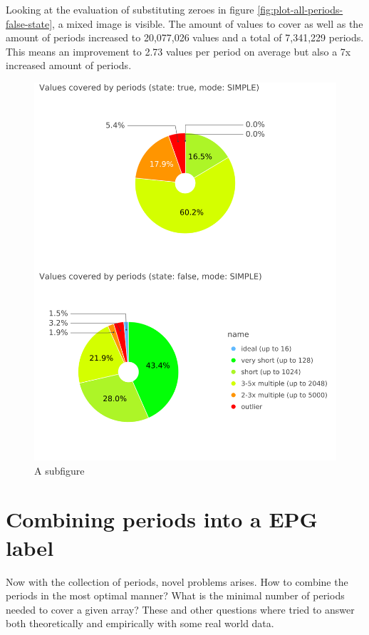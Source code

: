 Looking at the evaluation of substituting zeroes in figure \ref{fig:plot-all-periods-false-state}, a mixed image is visible. The amount of values to cover as well as the amount of periods increased to 20,077,026 values and a total of 7,341,229 periods. This means an improvement to 2.73 values per period on average but also a 7x increased amount of periods.

\begin{figure}[h]
	\includegraphics[width=\linewidth]{charts/all-covered-values-pie-chart-combined-ontop.png}
	\caption{A subfigure}
	\label{fig:sub2}
\end{figure}



\newpage

\section{Combining periods into a EPG label}

Now with the collection of periods, novel problems arises. How to combine the periods in the most optimal manner? What is the minimal number of periods needed to cover a given array? These and other questions where tried to answer both theoretically and empirically with some real world data.

